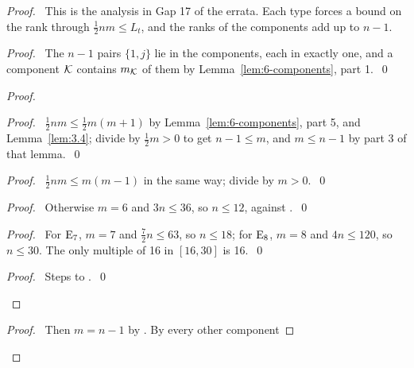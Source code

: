 \begin{proof}
 \pfsketch\ This is the analysis in Gap 17 of the errata. Each type forces a bound on the rank
 through $\frac12nm\leq L_t$, and the ranks of the components add up to $n-1$.
 \begin{proof}\pf\ The $n-1$ pairs $\{1,j\}$ lie in the components, each in exactly one, and a
  component ${\mathcal K}$ contains $m_{\mathcal K}$ of them by Lemma~\ref{lem:6-components}, part 1.~\qed
 \end{proof}
 \begin{proof}
  \begin{proof}\pf\ $\frac12nm\leq\frac12m(m+1)$ by Lemma~\ref{lem:6-components}, part 5, and
   Lemma~\ref{lem:3.4}; divide by $\frac12m>0$ to get $n-1\leq m$, and $m\leq n-1$ by part 3 of
   that lemma.~\qed\end{proof}
  \begin{proof}\pf\ $\frac12nm\leq m(m-1)$ in the same way; divide by $m>0$.~\qed\end{proof}
  \begin{proof}\pf\ Otherwise $m=6$ and $3n\leq36$, so $n\leq12$, against .~\qed
  \end{proof}
  \begin{proof}\pf\ For $\mathrm{E}_7$, $m=7$ and $\frac72n\leq63$, so $n\leq18$; for $\mathrm{E}_8$,
   $m=8$ and $4n\leq120$, so $n\leq30$. The only multiple of 16 in $[16,30]$ is 16.~\qed
  \end{proof}
  \qedstep
  \begin{proof}\pf\ Steps  to .~\qed\end{proof}
 \end{proof}
 \begin{proof}\pf\ Then $m=n-1$ by . By  every other component

\end{proof}
\end{proof}
